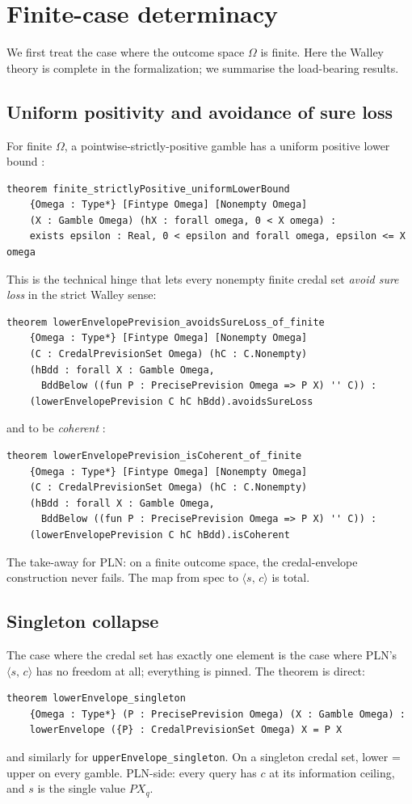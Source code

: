 \documentclass[]{article}
\newcommand{\lid}[1]{{\ttfamily\nolinkurl{#1}}}
\newcommand{\STV}[2]{\langle #1,\, #2 \rangle}
\begin{document}
\section{Finite-case determinacy}\label{sec:finite}

We first treat the case where the outcome space $\Omega$ is finite. Here
the Walley theory is complete in the formalization; we summarise the
load-bearing results.

\subsection{Uniform positivity and avoidance of sure loss}

For finite $\Omega$, a pointwise-strictly-positive gamble has a uniform
positive lower bound :
\begin{lstlisting}
theorem finite_strictlyPositive_uniformLowerBound
    {Omega : Type*} [Fintype Omega] [Nonempty Omega]
    (X : Gamble Omega) (hX : forall omega, 0 < X omega) :
    exists epsilon : Real, 0 < epsilon and forall omega, epsilon <= X omega
\end{lstlisting}
This is the technical hinge that lets every nonempty finite credal set
\emph{avoid sure loss} in the strict Walley sense:
\begin{lstlisting}
theorem lowerEnvelopePrevision_avoidsSureLoss_of_finite
    {Omega : Type*} [Fintype Omega] [Nonempty Omega]
    (C : CredalPrevisionSet Omega) (hC : C.Nonempty)
    (hBdd : forall X : Gamble Omega,
      BddBelow ((fun P : PrecisePrevision Omega => P X) '' C)) :
    (lowerEnvelopePrevision C hC hBdd).avoidsSureLoss
\end{lstlisting}
and to be \emph{coherent} :
\begin{lstlisting}
theorem lowerEnvelopePrevision_isCoherent_of_finite
    {Omega : Type*} [Fintype Omega] [Nonempty Omega]
    (C : CredalPrevisionSet Omega) (hC : C.Nonempty)
    (hBdd : forall X : Gamble Omega,
      BddBelow ((fun P : PrecisePrevision Omega => P X) '' C)) :
    (lowerEnvelopePrevision C hC hBdd).isCoherent
\end{lstlisting}
The take-away for PLN: on a finite outcome space, the credal-envelope
construction never fails. The map from spec to $\STV{s}{c}$ is total.

\subsection{Singleton collapse}

The case where the credal set has exactly one element is the case where
PLN's $\STV{s}{c}$ has no freedom at all; everything is pinned. The
theorem is direct:
\begin{lstlisting}
theorem lowerEnvelope_singleton
    {Omega : Type*} (P : PrecisePrevision Omega) (X : Gamble Omega) :
    lowerEnvelope ({P} : CredalPrevisionSet Omega) X = P X
\end{lstlisting}
and similarly for \lid{upperEnvelope\_singleton}. On a singleton credal
set, lower = upper on every gamble. PLN-side: every query has $c$ at its
information ceiling, and $s$ is the single value $P X_q$.
\end{document}
